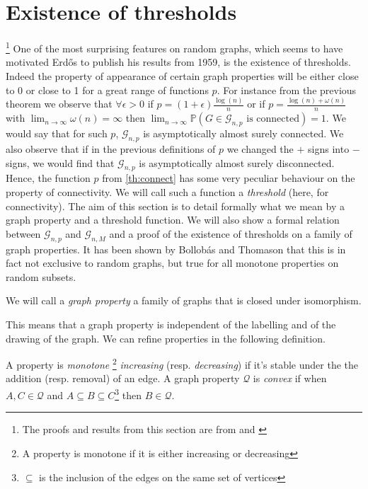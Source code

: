 \section{Existence of thresholds}\footnote{ The proofs and results from this section are from \cite{JLR} and \cite{Bollob01}}
One of the most surprising features on random graphs, which seems to have motivated Erd\H{o}s to publish his results from 1959, is the existence of thresholds.
Indeed the property of appearance of certain graph properties will be either close to 0 or close to 1 for a great range of functions $p$.
\newline
For instance from the previous theorem we observe that $\forall \epsilon > 0$  if $p = (1+\epsilon)\frac{\log(n)}{n}$ 
or if $p = \frac{\log(n) + \omega(n)}{n}$ with $\lim_{n\to \infty} \omega(n) = \infty$ then $\lim_{n\to\infty}\mathbb{P}(G \in \mathcal{G}_{n,p} \text{ is connected}) = 1$.
We would say that for such $p$, $\mathcal{G}_{n,p}$ is asymptotically almost surely connected.
We also observe that if in the previous definitions of $p$ we changed the $+$ signs into $-$ signs, we would find that $\mathcal{G}_{n,p}$ is asymptotically almost surely disconnected.
\newline
Hence, the function $p$ from \eqref{th:connect} has some very peculiar behaviour on the property of connectivity.
We will call such a function a \emph{threshold} (here, for connectivity).
\newline
The aim of this section is to detail formally what we mean by a graph property and a threshold function.
We will also show a formal relation between $\mathcal{G}_{n,p}$ and $\mathcal{G}_{n,M}$ and a proof of the existence of thresholds on a family of graph properties.
\newline
It has been shown by Bollob\'as and Thomason \cite{Bollob87} that this is in fact not exclusive to random graphs, but true for all monotone properties on random subsets.
\begin{definition}
	We will call a \emph{graph property} a family of graphs that is closed under isomorphism.
\end{definition}
This means that a graph property is independent of the labelling and of the drawing of the graph.
We can refine properties in the following definition.
\begin{definition}
	A property is \emph{monotone }\footnote{ A property is monotone if it is either increasing or decreasing} \emph{increasing} (resp. \emph{decreasing}) if it's stable under the the addition (resp. removal) of an edge.
	A graph property $\mathcal{Q}$ is \emph{convex} if when $ A,C \in \mathcal{Q}$ and $A\subseteq B\subseteq C$\footnote{ $\subseteq$ is the inclusion of the edges on the same set of vertices} then $B \in \mathcal{Q}$. 
\end{definition}

